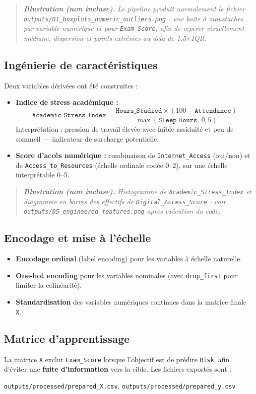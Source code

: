 \documentclass[a4paper,11pt]{article}
\newcommand{\notevisuel}[1]{%
  \begin{quote}\small\itshape
  \textbf{Illustration (non incluse).} #1
  \end{quote}
}
\begin{document}
\notevisuel{Le pipeline produit normalement le fichier \texttt{outputs/01\_boxplots\_numeric\_outliers.png} : une boîte à moustaches par variable numérique et pour \texttt{Exam\_Score}, afin de repérer visuellement médiane, dispersion et points extrêmes au-delà de 1{,}5$\times$IQR.}

\subsection{Ingénierie de caractéristiques}
Deux variables dérivées ont été construites :
\begin{itemize}[leftmargin=*]
  \item \textbf{Indice de stress académique :}
  \[
    \texttt{Academic\_Stress\_Index} = \frac{\texttt{Hours\_Studied} \times (100 - \texttt{Attendance})}{\max(\texttt{Sleep\_Hours},\,0{,}5)}
  \]
  Interprétation : pression de travail élevée avec faible assiduité et peu de sommeil --- indicateur de surcharge potentielle.
  \item \textbf{Score d'accès numérique :} combinaison de \texttt{Internet\_Access} (oui/non) et de \texttt{Access\_to\_Resources} (échelle ordinale codée 0--2), sur une échelle interprétable 0--5.
\end{itemize}

\notevisuel{Histogramme de \texttt{Academic\_Stress\_Index} et diagramme en barres des effectifs de \texttt{Digital\_Access\_Score} : voir \texttt{outputs/05\_engineered\_features.png} après exécution du code.}

\subsection{Encodage et mise à l'échelle}
\begin{itemize}[leftmargin=*]
  \item \textbf{Encodage ordinal} (label encoding) pour les variables à échelle naturelle.
  \item \textbf{One-hot encoding} pour les variables nominales (avec \texttt{drop\_first} pour limiter la colinéarité).
  \item \textbf{Standardisation} des variables numériques continues dans la matrice finale \texttt{X}.
\end{itemize}

\subsection{Matrice d'apprentissage}
La matrice \texttt{X} exclut \texttt{Exam\_Score} lorsque l'objectif est de prédire \texttt{Risk}, afin d'éviter une \textbf{fuite d'information} vers la cible. Les fichiers exportés sont :
\begin{center}
\texttt{outputs/processed/prepared\_X.csv}, \quad \texttt{outputs/processed/prepared\_y.csv}
\end{center}
\end{document}
